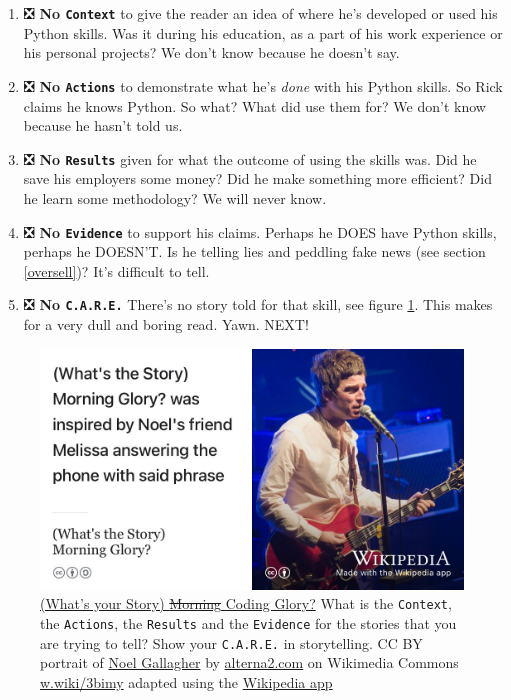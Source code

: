 \documentclass[
]{book}
\providecommand{\tightlist}{%
  \setlength{\itemsep}{0pt}\setlength{\parskip}{0pt}}
\begin{document}
\begin{enumerate}
\def\labelenumi{\arabic{enumi}.}
\tightlist
\item
  ❎ \textbf{No \texttt{Context}} to give the reader an idea of where he's developed or used his Python skills. Was it during his education, as a part of his work experience or his personal projects? We don't know because he doesn't say.\\
\item
  ❎ \textbf{No \texttt{Actions}} to demonstrate what he's \emph{done} with his Python skills. So Rick claims he knows Python. So what? What did use them for? We don't know because he hasn't told us.
\item
  ❎ \textbf{No \texttt{Results}} given for what the outcome of using the skills was. Did he save his employers some money? Did he make something more efficient? Did he learn some methodology? We will never know.\\
\item
  ❎ \textbf{No \texttt{Evidence}} to support his claims. Perhaps he DOES have Python skills, perhaps he DOESN'T. Is he telling lies and peddling fake news (see section \ref{oversell})? It's difficult to tell.
\item
  ❎ \textbf{No \texttt{C.A.R.E.}} There's no story told for that skill, see figure \ref{fig:gallagher-fig}. This makes for a very dull and boring read. Yawn. NEXT! 🥱
\end{enumerate}

\begin{figure}

{\centering \includegraphics[width=1\linewidth]{images/whats-the-story} 

}

\caption{\href{https://en.wikipedia.org/wiki/(What\%27s_the_Story)_Morning_Glory\%3F}{(What's your Story) \sout{Morning} Coding Glory?} \citep{whatsthestory} What is the \texttt{Context}, the \texttt{Actions}, the \texttt{Results} and the \texttt{Evidence} for the stories that you are trying to tell? Show your \texttt{C.A.R.E.} in storytelling. CC BY portrait of \href{https://en.wikipedia.org/wiki/Noel_Gallagher}{Noel Gallagher} by \href{https://alterna2.com/}{alterna2.com} on Wikimedia Commons \href{https://w.wiki/3bim}{w.wiki/3bimy} adapted using the \href{https://apps.apple.com/us/app/wikipedia/id324715238}{Wikipedia app}}\label{fig:gallagher-fig}
\end{figure}
\end{document}
